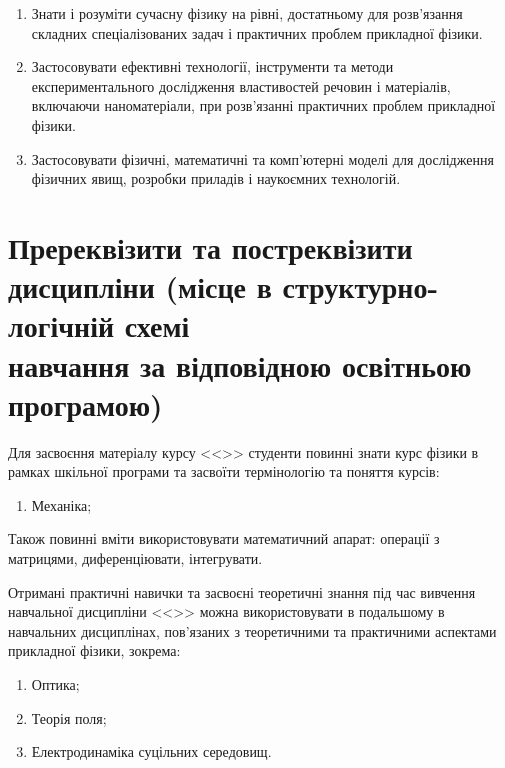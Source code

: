 \documentclass{Syllabus}
\begin{document}
\begin{enumerate}
	\item [ПРН 1:] Знати і розуміти сучасну фізику на рівні, достатньому для розв'язання складних спеціалізованих задач і практичних проблем прикладної фізики.
   	\item [ПРН 3:] Застосовувати ефективні технології, інструменти та методи експериментального дослідження властивостей речовин і матеріалів, включаючи наноматеріали, при розв’язанні практичних проблем прикладної фізики.
	\item [ПРН 4:] Застосовувати фізичні, математичні та комп'ютерні моделі для дослідження фізичних явищ, розробки приладів і наукоємних технологій.
\end{enumerate}


\section{Пререквізити та постреквізити дисципліни (місце в структурно-логічній схемі\\ навчання за відповідною освітньою програмою)}


Для засвоєння матеріалу курсу <<\discipline>> студенти повинні знати курс фізики в рамках шкільної програми та засвоїти термінологію та поняття курсів:
\begin{enumerate}
	\item Механіка;
\end{enumerate}

Також повинні вміти використовувати математичний апарат: операції з матрицями,  диференціювати, інтегрувати.

Отримані практичні навички та засвоєні теоретичні знання під час вивчення навчальної дисципліни <<\discipline>> можна використовувати в подальшому в навчальних дисциплінах, пов’язаних з теоретичними та практичними аспектами прикладної фізики, зокрема:

\begin{enumerate}
	\item Оптика;
	\item Теорія поля;
	\item Електродинаміка суцільних середовищ.
\end{enumerate}
\end{document}
